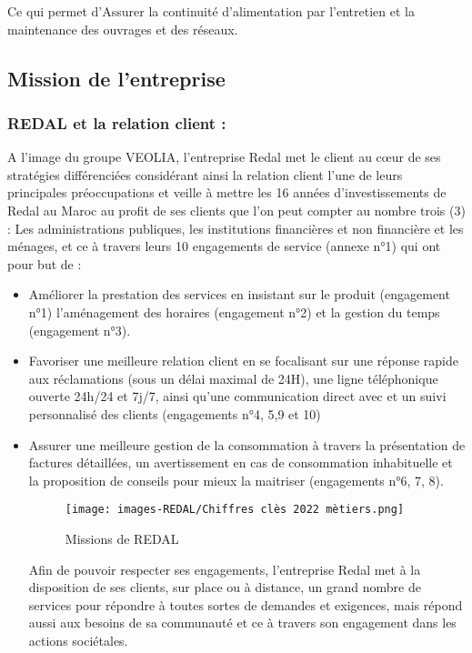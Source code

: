 Ce qui permet d’Assurer la continuité d’alimentation par l’entretien et la maintenance des 
ouvrages et des réseaux.


\subsection{Mission de l’entreprise}
\subsubsection{REDAL et la relation client :}
A l’image du groupe VEOLIA, l’entreprise Redal met le client au cœur de ses stratégies 
différenciées considérant ainsi la relation client l’une de leurs principales préoccupations et 
veille à mettre les 16 années d’investissements de Redal au Maroc au profit de ses clients que 
l’on peut compter au nombre trois (3) : Les administrations publiques, les institutions 
financières et non financière et les ménages, et ce à travers leurs 10 engagements de service 
(annexe n°1) qui ont pour but de :
\begin{itemize}
    \item Améliorer la prestation des services en insistant sur le produit (engagement n°1) 
l’aménagement des horaires (engagement n°2) et la gestion du temps (engagement 
n°3). 
   \item Favoriser une meilleure relation client en se focalisant sur une réponse rapide aux 
réclamations (sous un délai maximal de 24H), une ligne téléphonique ouverte 24h/24 
et 7j/7, ainsi qu’une communication direct avec et un suivi personnalisé des clients 
(engagements n°4, 5,9 et 10)
   \item Assurer une meilleure gestion de la consommation à travers la présentation de factures 
détaillées, un avertissement en cas de consommation inhabituelle et la proposition de 
conseils pour mieux la maitriser (engagements n°6, 7, 8).

\medskip
\begin{figure}[!h]
    \centering
    \texttt{[image: images-REDAL/Chiffres clès 2022 mètiers.png]}
    \caption{Missions de REDAL}
    \label{fig:3}
\end{figure}

\newpage

Afin de pouvoir respecter ses engagements, l’entreprise Redal met à la disposition de ses 
clients, sur place ou à distance, un grand nombre de services pour répondre à toutes sortes de 
demandes et exigences, mais répond aussi aux besoins de sa communauté et ce à travers son 
engagement dans les actions sociétales.
\end{itemize}





